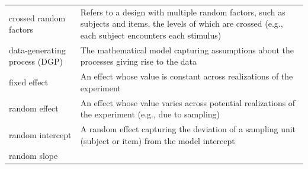 \documentclass[
  english,
  doc,floatsintext]{apa6}
\begin{document}
\begin{tcolorbox}[colback=black!5!white,colframe=white!5!black,title=Box 1. Glossary of terms]
\begin{longtable}[]{@{}ll@{}}
\begin{minipage}[t]{0.29\columnwidth}\raggedright
crossed random factors\strut
\end{minipage} & \begin{minipage}[t]{0.65\columnwidth}\raggedright
Refers to a design with multiple random factors, such as subjects and items, the levels of which are crossed (e.g., each subject encounters each stimulus) \strut
\end{minipage}\tabularnewline
\begin{minipage}[t]{0.29\columnwidth}\raggedright
data-generating process (DGP)\strut
\end{minipage} & \begin{minipage}[t]{0.65\columnwidth}\raggedright
The mathematical model capturing assumptions about the processes giving rise to the data\strut
\end{minipage}\tabularnewline
\begin{minipage}[t]{0.29\columnwidth}\raggedright
fixed effect\strut
\end{minipage} & \begin{minipage}[t]{0.65\columnwidth}\raggedright
An effect whose value is constant across realizations of the experiment\strut
\end{minipage}\tabularnewline
\begin{minipage}[t]{0.29\columnwidth}\raggedright
random effect\strut
\end{minipage} & \begin{minipage}[t]{0.65\columnwidth}\raggedright
An effect whose value varies across potential realizations of the experiment (e.g., due to sampling)\strut
\end{minipage}\tabularnewline
\begin{minipage}[t]{0.29\columnwidth}\raggedright
random intercept\strut
\end{minipage} & \begin{minipage}[t]{0.65\columnwidth}\raggedright
A random effect capturing the deviation of a sampling unit (subject or item) from the model intercept\strut
\end{minipage}\tabularnewline
\begin{minipage}[t]{0.29\columnwidth}\raggedright
random slope\strut
\end{minipage} & \begin{minipage}[t]{0.65\columnwidth}\raggedright

\end{minipage}
\end{longtable}
\end{tcolorbox}
\end{document}
